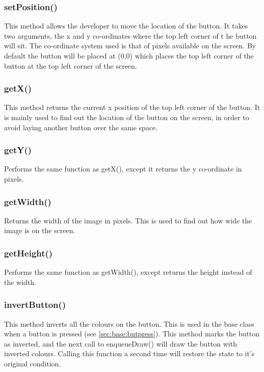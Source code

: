 \subsubsection{setPosition()}

This method allows the developer to move the location of the button. It takes two arguments, the x and y co-ordinates where the top left corner of t he button will sit. The co-ordinate system used is that of pixels available on the screen. By default the button will be placed at (0,0) which places the top left corner of the button at the top left corner of the screen.

\subsubsection{getX()}

This method returns the current x position of the top left corner of the button. It is mainly used to find out the location of the button on the screen, in order to avoid laying another button over the same space.

\subsubsection{getY()}

Performs the same function as getX(), except it returns the y co-ordinate in pixels.

\subsubsection{getWidth()}

Returns the width of the image in pixels. This is used to find out how wide the image is on the screen.

\subsubsection{getHeight()}

Performs the same function as getWidth(), except returns the height instead of the width.

\subsubsection{invertButton()}

This method inverts all the colours on the button. This is used in the base class when a button is pressed (see \ref{sec:base:butpress}). This method marks the button as inverted, and the next call to enqueueDraw() will draw the button with inverted colours. Calling this function a second time will restore the state to it's original condition.

